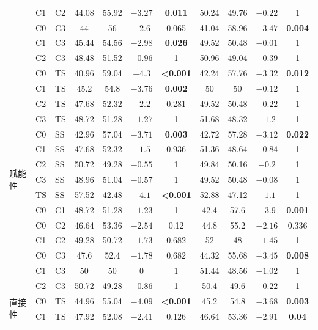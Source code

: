 \documentclass[11pt,UTF8,fontset=fandol]{ctexart}
\begin{document}
\begin{center}
\begin{longtable}{@{}lll cccc cccc@{}}
 & C1 & C2 & 44.08 & 55.92 & $-3.27$ & \textbf{0.011} & 50.24 & 49.76 & $-0.22$ & 1 \\
 & C0 & C3 & 44 & 56 & $-2.6$ & 0.065 & 41.04 & 58.96 & $-3.47$ & \textbf{0.004} \\
 & C1 & C3 & 45.44 & 54.56 & $-2.98$ & \textbf{0.026} & 49.52 & 50.48 & $-0.01$ & 1 \\
 & C2 & C3 & 48.48 & 51.52 & $-0.96$ & 1 & 50.96 & 49.04 & $-0.39$ & 1 \\
\midrule
\multirow{15}{*}{赋能性}
 & C0 & TS & 40.96 & 59.04 & $-4.3$ & \textbf{<0.001} & 42.24 & 57.76 & $-3.32$ & \textbf{0.012} \\
 & C1 & TS & 45.2 & 54.8 & $-3.76$ & \textbf{0.002} & 50 & 50 & $-0.12$ & 1 \\
 & C2 & TS & 47.68 & 52.32 & $-2.2$ & 0.281 & 49.52 & 50.48 & $-0.22$ & 1 \\
 & C3 & TS & 48.72 & 51.28 & $-1.27$ & 1 & 51.68 & 48.32 & $-1.2$ & 1 \\
 & C0 & SS & 42.96 & 57.04 & $-3.71$ & \textbf{0.003} & 42.72 & 57.28 & $-3.12$ & \textbf{0.022} \\
 & C1 & SS & 47.68 & 52.32 & $-1.5$ & 0.936 & 51.36 & 48.64 & $-0.84$ & 1 \\
 & C2 & SS & 50.72 & 49.28 & $-0.55$ & 1 & 49.84 & 50.16 & $-0.2$ & 1 \\
 & C3 & SS & 48.96 & 51.04 & $-0.57$ & 1 & 49.52 & 50.48 & $-0.08$ & 1 \\
 & TS & SS & 57.52 & 42.48 & $-4.1$ & \textbf{<0.001} & 52.88 & 47.12 & $-1.1$ & 1 \\
 & C0 & C1 & 48.72 & 51.28 & $-1.23$ & 1 & 42.4 & 57.6 & $-3.9$ & \textbf{0.001} \\
 & C0 & C2 & 46.64 & 53.36 & $-2.54$ & 0.12 & 44.8 & 55.2 & $-2.16$ & 0.336 \\
 & C1 & C2 & 49.28 & 50.72 & $-1.73$ & 0.682 & 52 & 48 & $-1.45$ & 1 \\
 & C0 & C3 & 47.6 & 52.4 & $-1.78$ & 0.682 & 44.32 & 55.68 & $-3.45$ & \textbf{0.008} \\
 & C1 & C3 & 50 & 50 & 0 & 1 & 51.44 & 48.56 & $-1.02$ & 1 \\
 & C2 & C3 & 50.72 & 49.28 & $-0.86$ & 1 & 50.4 & 49.6 & $-0.22$ & 1 \\
\midrule
\multirow{15}{*}{直接性}
 & C0 & TS & 44.96 & 55.04 & $-4.09$ & \textbf{<0.001} & 45.2 & 54.8 & $-3.68$ & \textbf{0.003} \\
 & C1 & TS & 47.92 & 52.08 & $-2.41$ & 0.126 & 46.64 & 53.36 & $-2.91$ & \textbf{0.04} \\

\end{longtable}
\end{center}
\end{document}
